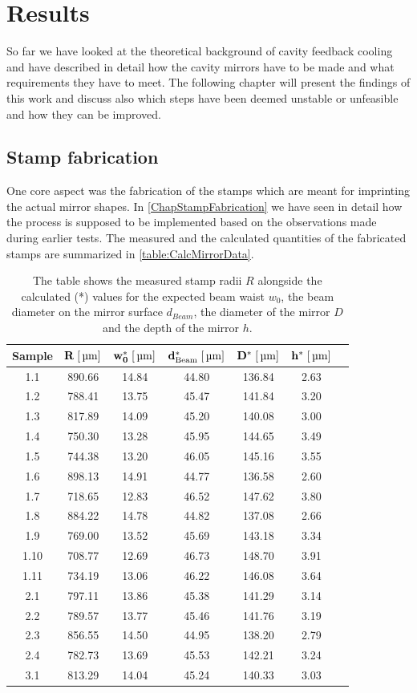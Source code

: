 \chapter{Results}
So far we have looked at the theoretical background of cavity feedback cooling and have described in detail how the cavity mirrors have to be made and what requirements they have to meet. The following chapter will present the findings of this work and discuss also which steps have been deemed unstable or unfeasible and how they can be improved.

\section{Stamp fabrication}
One core aspect was the fabrication of the stamps which are meant for imprinting the actual mirror shapes. In \autoref{ChapStampFabrication} we have seen in detail how the process is supposed to be implemented based on the observations made during earlier tests. The measured and the calculated quantities of the fabricated stamps are summarized in \autoref{table:CalcMirrorData}.
\begin{table}[H]
	\begin{tabular}{ccccccc}
	\hline
\textbf{Sample} & \textbf{$\mathbf{R\;[\um]}$} & \textbf{$\mathbf{w_0^*\;[\um]}$} & \textbf{$\mathbf{d_{\si{Beam}}^*\;[\um]}$} & \textbf{$\mathbf{D^*\;[\um]}$} & \textbf{$\mathbf{h^*\;[\um]}$} \\
	\hline
	1.1 & 890.66 & 14.84 & 44.80 & 136.84 & 2.63 \\
	1.2 & 788.41 & 13.75 & 45.47 & 141.84 & 3.20 \\
	1.3 & 817.89 & 14.09 & 45.20 & 140.08 & 3.00 \\
	1.4 & 750.30 & 13.28 & 45.95 & 144.65 & 3.49 \\
	1.5 & 744.38 & 13.20 & 46.05 & 145.16 & 3.55 \\
	1.6 & 898.13 & 14.91 & 44.77 & 136.58 & 2.60 \\
	1.7 & 718.65 & 12.83 & 46.52 & 147.62 & 3.80 \\
	1.8 & 884.22 & 14.78 & 44.82 & 137.08 & 2.66 \\
	1.9 & 769.00 & 13.52 & 45.69 & 143.18 & 3.34 \\
	1.10 & 708.77 & 12.69 & 46.73 & 148.70 & 3.91 \\
	1.11 & 734.19 & 13.06 & 46.22 & 146.08 & 3.64 \\
	2.1 & 797.11 & 13.86 & 45.38 & 141.29 & 3.14 \\
	2.2 & 789.57 & 13.77 & 45.46 & 141.76 & 3.19 \\
	2.3 & 856.55 & 14.50 & 44.95 & 138.20 & 2.79 \\
	2.4 & 782.73 & 13.69 & 45.53 & 142.21 & 3.24 \\
	3.1 & 813.29 & 14.04 & 45.24 & 140.33 & 3.03 \\
	\hline
\end{tabular}
	\caption{The table shows the measured stamp radii $R$ alongside the calculated (*) values for the expected beam waist $w_0$, the beam diameter on the mirror surface $d_{\si{Beam}}$, the diameter of the mirror $D$ and the depth of the mirror $h$.}
	\label{table:CalcMirrorData}
\end{table}
